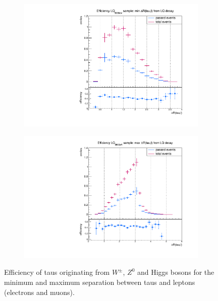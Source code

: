 \begin{figure}
\begin{subfigure}[t]{0.49\textwidth}
                \label{dR:bg:prompt:taulepton:max}
                \end{subfigure}
                \begin{subfigure}[t]{0.49\textwidth}
                \includegraphics[width=\textwidth]{figures/plots/ttH/Divided_fromH_mindR_taulepton.pdf}
                \label{dR:bg:fromH:taulepton:min}
                \end{subfigure}
                \begin{subfigure}[t]{0.49\textwidth}
                \includegraphics[width=\textwidth]{figures/plots/ttH/Divided_maxdR_fromH_taulepton.pdf}
                \label{dR:bg:fromH:taulepton:max}
                \end{subfigure}
\caption[Efficiency of taus originating from $W^\pm$, $Z^0$ and Higgs bosons for the separation between taus and leptons.]{Efficiency of taus originating from $W^\pm$, $Z^0$ and Higgs bosons for the minimum and maximum separation between taus and leptons (electrons and muons).}
\label{dR:bg:taulepton}
\end{figure}
